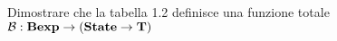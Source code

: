 {Dimostrare che la tabella 1.2 definisce una funzione totale 
$\mathcal{B}: \mbox{\textbf{Bexp}} \rightarrow (\mbox{\textbf{State}} \rightarrow \mbox{\textbf{T}})$}
{}
